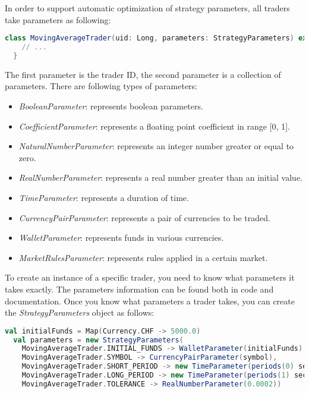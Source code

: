 In order to support automatic optimization of strategy parameters, all traders take parameters as following:

\begin{lstlisting}[language=Scala]
  class MovingAverageTrader(uid: Long, parameters: StrategyParameters) extends Trader(uid, parameters) {
    // ...
  }
\end{lstlisting}

The first parameter is the trader ID, the second parameter is a collection of parameters. There are following types of parameters:

\begin{itemize}
\item \emph{BooleanParameter}: represents boolean parameters.
\item \emph{CoefficientParameter}: represents a floating point coefficient in range [0, 1].
\item \emph{NaturalNumberParameter}: represents an integer number greater or equal to zero.
\item \emph{RealNumberParameter}: represents a real number greater than an initial value.
\item \emph{TimeParameter}: represents a duration of time.
\item \emph{CurrencyPairParameter}: represents a pair of currencies to be traded.
\item \emph{WalletParameter}: represents funds in various currencies.
\item \emph{MarketRulesParameter}: represents rules applied in a certain market.
\end{itemize}

To create an instance of a specific trader, you need to know what parameters it takes exactly. The parameters information can be found both in code and documentation. Once you know what parameters a trader takes, you can create the \emph{StrategyParameters} object as follows:

\begin{lstlisting}[language=Scala]
  val initialFunds = Map(Currency.CHF -> 5000.0)
  val parameters = new StrategyParameters(
    MovingAverageTrader.INITIAL_FUNDS -> WalletParameter(initialFunds),
    MovingAverageTrader.SYMBOL -> CurrencyPairParameter(symbol),
    MovingAverageTrader.SHORT_PERIOD -> new TimeParameter(periods(0) seconds),
    MovingAverageTrader.LONG_PERIOD -> new TimeParameter(periods(1) seconds),
    MovingAverageTrader.TOLERANCE -> RealNumberParameter(0.0002))
\end{lstlisting}

